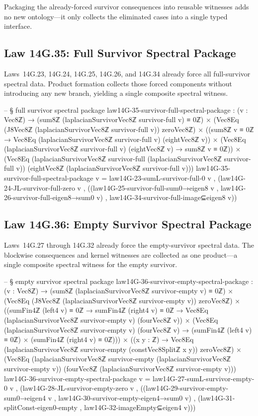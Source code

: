 \documentclass[11pt,a4paper]{book}
\begin{document}
Packaging the already-forced survivor consequences into reusable witnesses
adds no new ontology---it only collects the eliminated cases into a single typed interface.

\subsection{Law 14G.35: Full Survivor Spectral Package}

Laws~14G.23, 14G.24, 14G.25, 14G.26, and 14G.34 already force all full-survivor spectral data. Product formation collects those forced components without introducing any new branch, yielding a single composite spectral witness.

\begin{code}
-- § full survivor spectral package
law14G-35-survivor-full-spectral-package : (v : Vec8ℤ) →
  (sum8ℤ (laplacianSurvivorVec8ℤ survivor-full v) ≡ 0ℤ) ×
  (Vec8Eq (J8Vec8ℤ (laplacianSurvivorVec8ℤ survivor-full v)) zeroVec8ℤ) ×
  ((sum8ℤ v ≡ 0ℤ → Vec8Eq (laplacianSurvivorVec8ℤ survivor-full v) (eightVec8ℤ v)) ×
   (Vec8Eq (laplacianSurvivorVec8ℤ survivor-full v) (eightVec8ℤ v) → sum8ℤ v ≡ 0ℤ)) ×
  (Vec8Eq (laplacianSurvivorVec8ℤ survivor-full (laplacianSurvivorVec8ℤ survivor-full v))
         (eightVec8ℤ (laplacianSurvivorVec8ℤ survivor-full v)))
law14G-35-survivor-full-spectral-package v =
  law14G-23-sumL-survivor-full-0 v ,
  (law14G-24-JL-survivor-full-zero v ,
   ((law14G-25-survivor-full-sum0→eigen8 v , law14G-26-survivor-full-eigen8→sum0 v) ,
    law14G-34-survivor-full-image⊆eigen8 v))
\end{code}

\subsection{Law 14G.36: Empty Survivor Spectral Package}

Laws~14G.27 through 14G.32 already force the empty-survivor spectral data. The blockwise consequences and kernel witnesses are collected as one product---a single composite spectral witness for the empty survivor.

\begin{code}
-- § empty survivor spectral package
law14G-36-survivor-empty-spectral-package : (v : Vec8ℤ) →
  (sum8ℤ (laplacianSurvivorVec8ℤ survivor-empty v) ≡ 0ℤ) ×
  (Vec8Eq (J8Vec8ℤ (laplacianSurvivorVec8ℤ survivor-empty v)) zeroVec8ℤ) ×
  ((sumFin4ℤ (left4 v) ≡ 0ℤ → sumFin4ℤ (right4 v) ≡ 0ℤ → Vec8Eq (laplacianSurvivorVec8ℤ survivor-empty v) (fourVec8ℤ v)) ×
   (Vec8Eq (laplacianSurvivorVec8ℤ survivor-empty v) (fourVec8ℤ v) → (sumFin4ℤ (left4 v) ≡ 0ℤ) × (sumFin4ℤ (right4 v) ≡ 0ℤ))) ×
  ((x y : ℤ) → Vec8Eq (laplacianSurvivorVec8ℤ survivor-empty (constVec8Splitℤ x y)) zeroVec8ℤ) ×
  (Vec8Eq (laplacianSurvivorVec8ℤ survivor-empty (laplacianSurvivorVec8ℤ survivor-empty v))
         (fourVec8ℤ (laplacianSurvivorVec8ℤ survivor-empty v)))
law14G-36-survivor-empty-spectral-package v =
  law14G-27-sumL-survivor-empty-0 v ,
  (law14G-28-JL-survivor-empty-zero v ,
   ((law14G-29-survivor-empty-sum0→eigen4 v , law14G-30-survivor-empty-eigen4→sum0 v) ,
    (law14G-31-splitConst-eigen0-empty ,
     law14G-32-imageEmpty⊆eigen4 v)))
\end{code}
\end{document}
